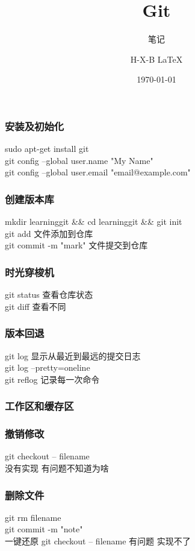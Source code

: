 \documentclass{beamer}
\newcommand{\quotes}[1]{"#1"}
\begin{document}
\begin{CJK}{UTF8}{gkai}

    \title{Git}
  \subtitle{笔记}
  \author{H-X-B \LaTeX{} }
  \date{\today}

  \frame{\titlepage}

  \begin{frame}\frametitle{安装及初始化}
    sudo apt-get install git\\
    git config --global user.name \quotes{My Name}\\
    git config --global user.email \quotes{email@example.com}\\
  \end{frame}

  \begin{frame}\frametitle{创建版本库}
    mkdir learninggit \&\& cd learninggit \&\& git init \\
    git add 文件添加到仓库\\
    git commit -m \quotes{mark} 文件提交到仓库\\
  \end{frame}

  \begin{frame}\frametitle{时光穿梭机}
    git status 查看仓库状态\\
    git diff 查看不同
  \end{frame}

  \begin{frame}\frametitle{版本回退}
    git log 显示从最近到最远的提交日志\\
    git log --pretty=oneline\\
    git reflog 记录每一次命令\\
  \end{frame}

  \begin{frame}\frametitle{工作区和缓存区}

  \end{frame}

  \begin{frame}\frametitle{撤销修改}
    git checkout -- filename\\
    没有实现 有问题不知道为啥
  \end{frame}

  \begin{frame}\frametitle{删除文件}
    git rm filename\\
    git commit -m \quotes{note}\\
    一键还原 git checkout -- filename 有问题 实现不了
  \end{frame}


\end{CJK}
\end{document}
